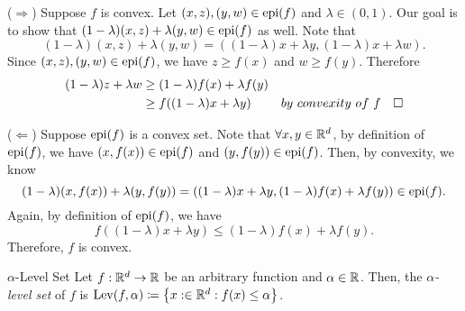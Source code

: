 \begin{prf}
	($\Rightarrow$) Suppose $f$ is convex. Let $(x,z),(y,w)\in\operatorname{epi}(f)$ and $\lambda\in(0,1)$. Our goal is to show that $(1-\lambda)(x,z)+\lambda(y,w)\in\operatorname{epi}(f)$ as well. Note that \[(1-\lambda)(x,z)+\lambda(y,w)=((1-\lambda)x+\lambda y, (1-\lambda)x+\lambda w).\] Since $(x,z),(y,w)\in\operatorname{epi}(f)$, we have $z\geq f(x)$ and $w\geq f(y)$. Therefore \begin{align*}(1-\lambda)z+\lambda w&\geq(1-\lambda)f(x)+\lambda f(y)\\&\geq f((1-\lambda)x+\lambda y)&by\ convexity\ of\ f\quad\square
	\end{align*}\par 
	($\Leftarrow$) Suppose $\operatorname{epi}(f)$ is a convex set. Note that $\forall x,y\in{\mathbb{R}}^d$, by definition of $\operatorname{epi}(f)$, we have $(x,f(x))\in\operatorname{epi}(f)$ and $(y,f(y))\in\operatorname{epi}(f)$. Then, by convexity, we know \[(1-\lambda)(x,f(x))+\lambda(y,f(y))=((1-\lambda)x+\lambda y,(1-\lambda)f(x)+\lambda f(y))\in\operatorname{epi}(f).\] Again, by definition of $\operatorname{epi}(f)$, we have \[f((1-\lambda)x+\lambda y)\leq(1-\lambda)f(x)+\lambda f(y).\] Therefore, $f$ is convex. 
\end{prf}
\begin{df}{$\alpha$-Level Set}
	Let $f:{\mathbb{R}}^d\to{\mathbb{R}}$ be an arbitrary function and $\alpha\in{\mathbb{R}}$. Then, the \textit{$\alpha$-level set} of $f$ is $\operatorname{Lev}(f,\alpha)\coloneqq\qty{x:\in{\mathbb{R}}^d:f(x)\leq\alpha}$. 
\end{df}
